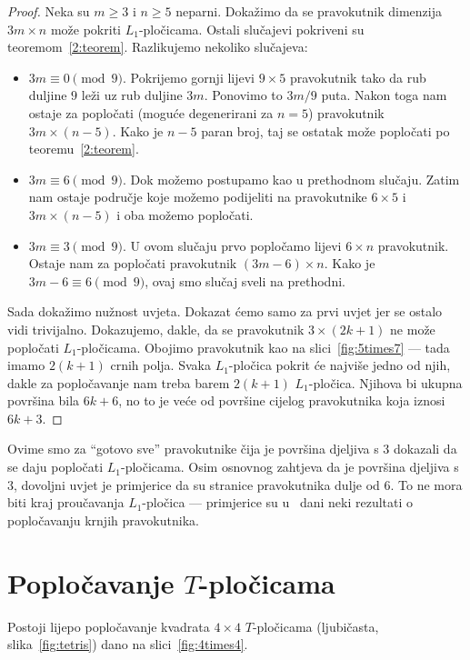 \documentclass[11pt]{scrartcl}
\begin{document}
\begin{proof}
Neka su $m \geq 3$ i $n \geq 5$ neparni. Dokažimo da se pravokutnik dimenzija $3m \times n$ može pokriti $L_1$-pločicama. Ostali slučajevi pokriveni su teoremom~\ref{2:teorem}. Razlikujemo nekoliko slučajeva:
\begin{itemize}
\item $3m \equiv 0 \pmod{9}$. Pokrijemo gornji lijevi $9 \times 5$ pravokutnik tako da rub duljine $9$ leži uz rub duljine $3m$. Ponovimo to $3m/9$ puta. Nakon toga nam ostaje za popločati (moguće degenerirani za $n=5$) pravokutnik $3m \times (n-5)$. Kako je $n - 5$ paran broj, taj se ostatak može popločati po teoremu~\ref{2:teorem}.

\item $3m \equiv 6 \pmod{9}$. Dok možemo postupamo kao u prethodnom slučaju. Zatim nam ostaje područje koje možemo podijeliti na pravokutnike $6 \times 5$ i $3m \times (n-5)$ i oba možemo popločati.

\item $3m \equiv 3 \pmod{9}$. U ovom slučaju prvo popločamo lijevi $6 \times n$ pravokutnik. Ostaje nam za popločati pravokutnik $(3m-6) \times n$. Kako je $3m - 6 \equiv 6 \pmod{9}$, ovaj smo slučaj sveli na prethodni.
\end{itemize}

Sada dokažimo nužnost uvjeta. Dokazat ćemo samo za prvi uvjet jer se ostalo vidi trivijalno. Dokazujemo, dakle, da se pravokutnik $3 \times (2k+1)$ ne može popločati $L_1$-plo\-či\-ca\-ma. Obojimo pravokutnik kao na slici~\ref{fig:5times7} --- tada imamo $2(k+1)$ crnih polja. Svaka $L_1$-pločica pokrit će najviše jedno od njih, dakle za popločavanje nam treba barem $2(k+1)$ $L_1$-pločica. Njihova bi ukupna površina bila $6k + 6$, no to je veće od površine cijelog pravokutnika koja iznosi $6k+ 3$.
\end{proof}
Ovime smo za \enquote{gotovo sve} pravokutnike čija je površina djeljiva s $3$ dokazali da se daju popločati $L_1$-pločicama. Osim osnovnog zahtjeva da je površina djeljiva s $3$, dovoljni uvjet je primjerice da su stranice pravokutnika dulje od $6$. To ne mora biti kraj proučavanja $L_1$-pločica --- primjerice su u~\cite{Ltromine} dani neki rezultati o popločavanju krnjih pravokutnika.

\section{Popločavanje \texorpdfstring{$T$-pločicama}{TEXT}} \label{odj:Tplocice}
Postoji lijepo popločavanje kvadrata $4 \times 4$ $T$-pločicama (ljubičasta, slika~\ref{fig:tetris}) dano na slici~\ref{fig:4times4}.
\end{document}
